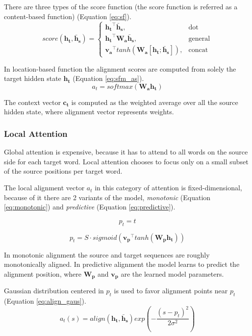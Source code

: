 There are three types of the score function (the score function is referred as a content-based function) (Equation \ref{eq:sf}).
\begin{equation}\label{eq:sf}
score(\mathbf{h_t}, \mathbf{\bar{h}_s}) = \begin{cases} \mathbf{h_t}^\intercal \mathbf{\bar{h}_s}, & \mbox{dot} \\ \mathbf{h_t}^\intercal \mathbf{W_a} \mathbf{\bar{h}_s}, & \mbox{general} \\ \mathbf{v_a}^\intercal tanh(\mathbf{W_a} [\mathbf{h_t}; \mathbf{\bar{h}_s}]), & \mbox{concat} \end{cases}
\end{equation}

In location-based function the alignment scores are computed from solely the target hidden state $\mathbf{h_t}$ (Equation \ref{eq:sfm_as}).
\begin{equation} \label{eq:sfm_as}
a_t = softmax(\mathbf{W_a}\mathbf{h_t})
\end{equation}

The context vector $\mathbf{c_t}$ is computed as the weighted average over all the source hidden state, where alignment vector represents weights.

\subsubsection{Local Attention}
Global attention is expensive, because it has to attend to all words on the source side for each target word. Local attention chooses to focus only on a small subset of the source positions per target word.

The local alignment vector $a_t$ in this category of attention is fixed-dimensional, because of it there are 2 variants of the model, \textit{monotonic} (Equation \ref{eq:monotonic}) and \textit{predictive} (Equation \ref{eq:predictive}).

\begin{equation} \label{eq:monotonic}
p_t = t
\end{equation}

\begin{equation} \label{eq:predictive}
p_t = S \cdot sigmoid(\mathbf{v_p}^\intercal tanh(\mathbf{W_p} \mathbf{h_t}))
\end{equation}

In monotonic alignment the source and target sequences are roughly monotonically aligned. In predictive alignment the model learns to predict the alignment position, where $\mathbf{W_p}$ and $\mathbf{v_p}$ are the learned model parameters.

Gaussian distribution centered in $p_t$ is used to favor alignment points near $p_t$ (Equation \ref{eq:align_gaus}).
\begin{equation} \label{eq:align_gaus}
a_t(s) = align(\mathbf{h_t}, \mathbf{\bar{h}_s}) exp(-\frac{(s-p_t)^2}{2\sigma^2})
\end{equation}

